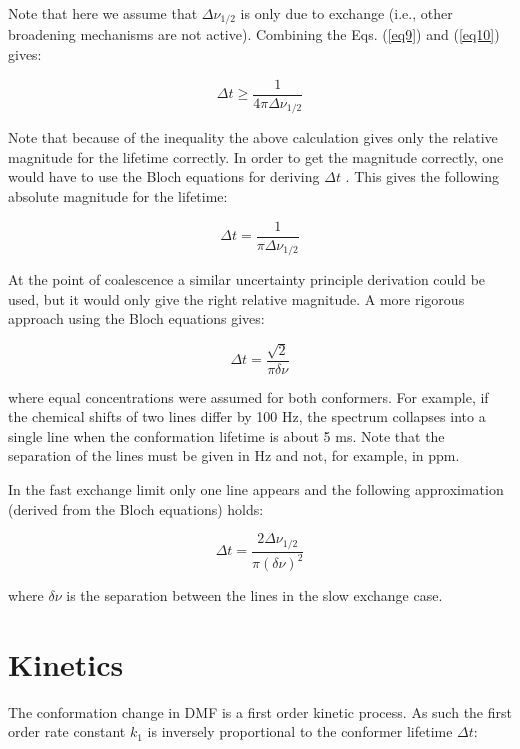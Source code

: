 \documentclass[byrevtex,amssymb,aps,pra,floatfix,letterpaper]{revtex4}
\begin{document}
\noindent
Note that here we assume that $\Delta\nu_{1/2}$ is only due to exchange (i.e., other broadening mechanisms are not active). Combining the Eqs. (\ref{eq9}) and (\ref{eq10}) gives:

\begin{equation}
\Delta t\ge\frac{1}{4\pi\Delta\nu_{1/2}}
\label{eq11}
\end{equation}

Note that because of the inequality the above calculation gives only the relative magnitude for the lifetime correctly. In order to get the magnitude correctly, one would have to use the Bloch equations for deriving $\Delta t$ \cite{GUNTHER}. This gives the following absolute magnitude for the lifetime:

\begin{equation}
\Delta t = \frac{1}{\pi\Delta\nu_{1/2}}
\label{eq12}
\end{equation}

At the point of coalescence a similar uncertainty principle derivation could be used, but it would only give the right relative magnitude. A more rigorous approach using the Bloch equations gives:

\begin{equation}
\Delta t = \frac{\sqrt{2}}{\pi\delta\nu}
\label{eq13}
\end{equation}

\noindent
where equal concentrations were assumed for both conformers. For example, if the chemical shifts of two lines differ by 100 Hz, the spectrum collapses into a single line when the conformation lifetime is about 5 ms. Note that the separation of the lines must be given in Hz and not, for example, in ppm.

In the fast exchange limit only one line appears and the following approximation (derived from the Bloch equations) holds:

\begin{equation}
\Delta t = \frac{2\Delta\nu_{1/2}}{\pi\left(\delta\nu\right)^2}
\label{eq14}
\end{equation}

\noindent
where $\delta\nu$ is the separation between the lines in the slow exchange case.

\section{Kinetics}

The conformation change in DMF is a first order kinetic process. As such the first order rate constant $k_1$ is inversely proportional to the conformer lifetime $\Delta t$:
\end{document}
